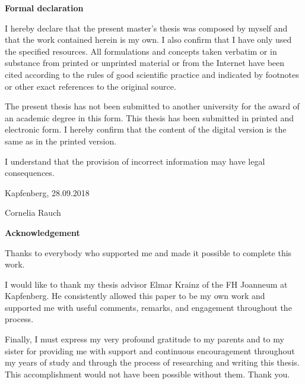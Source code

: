 \begin{titlepage}


\begin{center}\large\bf
Formal declaration
\end{center}


I hereby declare that the present master's thesis was composed by myself and that the work contained herein is my own. I also confirm that I have only used the specified resources. All formulations and concepts taken verbatim or in substance from printed or unprinted material or from the Internet have been cited according to the rules of good scientific practice and indicated by footnotes or other exact references to the original source. 

The present thesis has not been submitted to another university for the award of an academic degree in this form. This thesis has been submitted in printed and electronic form. I hereby confirm that the content of the digital version is the same as in the printed version.

I understand that the provision of incorrect information may have legal consequences.

\vspace{1,5cm}
Kapfenberg, 28.09.2018

\flushright
\vspace{15mm}
Cornelia Rauch

\end{titlepage}



\chapterend

\begin{titlepage}

\begin{center}\large\bf
Acknowledgement
\end{center}
Thanks to everybody who supported me and made it possible to complete this work.

I would like to thank my thesis advisor Elmar Krainz of the FH Joanneum at Kapfenberg. He consistently allowed this paper to be my own work and supported me with useful comments, remarks, and engagement throughout the process. 

Finally, I must express my very profound gratitude to my parents and to my sister for providing me with support and continuous encouragement throughout my years of study and through the process of researching and writing this thesis. This accomplishment would not have been possible without them. Thank you.

\end{titlepage}



\chapterend
